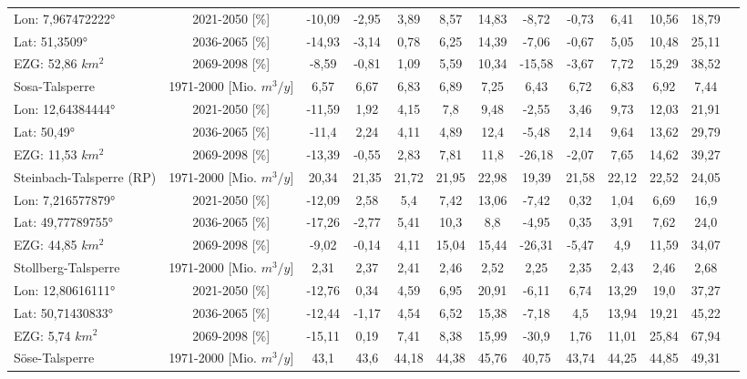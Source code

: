 \begin{longtable}{@{\extracolsep{\fill}}lc|ccccc||cccccc}
\cline{2-13} 
Lon: 7,967472222° & 2021-2050 [\%]  & -10,09 & -2,95 & 3,89 & 8,57 & 14,83 & -8,72 & -0,73 & 6,41 & 10,56 & 18,79 & \\ 
Lat: 51,3509° & 2036-2065 [\%]  & -14,93 & -3,14 & 0,78 & 6,25 & 14,39 & -7,06 & -0,67 & 5,05 & 10,48 & 25,11 & \\ 
EZG: 52,86 $km^2$ & 2069-2098 [\%]  & -8,59 & -0,81 & 1,09 & 5,59 & 10,34 & -15,58 & -3,67 & 7,72 & 15,29 & 38,52 & \\ 
\hline 
Sosa-Talsperre & 1971-2000 [Mio. $m^3/y$]  & 6,57 & 6,67 & 6,83 & 6,89 & 7,25 & 6,43 & 6,72 & 6,83 & 6,92 & 7,44 & \\ 
\cline{2-13} 
Lon: 12,64384444° & 2021-2050 [\%]  & -11,59 & 1,92 & 4,15 & 7,8 & 9,48 & -2,55 & 3,46 & 9,73 & 12,03 & 21,91 & \\ 
Lat: 50,49° & 2036-2065 [\%]  & -11,4 & 2,24 & 4,11 & 4,89 & 12,4 & -5,48 & 2,14 & 9,64 & 13,62 & 29,79 & \\ 
EZG: 11,53 $km^2$ & 2069-2098 [\%]  & -13,39 & -0,55 & 2,83 & 7,81 & 11,8 & -26,18 & -2,07 & 7,65 & 14,62 & 39,27 & \\ 
\hline 
Steinbach-Talsperre (RP) & 1971-2000 [Mio. $m^3/y$]  & 20,34 & 21,35 & 21,72 & 21,95 & 22,98 & 19,39 & 21,58 & 22,12 & 22,52 & 24,05 & \\ 
\cline{2-13} 
Lon: 7,216577879° & 2021-2050 [\%]  & -12,09 & 2,58 & 5,4 & 7,42 & 13,06 & -7,42 & 0,32 & 1,04 & 6,69 & 16,9 & \\ 
Lat: 49,77789755° & 2036-2065 [\%]  & -17,26 & -2,77 & 5,41 & 10,3 & 8,8 & -4,95 & 0,35 & 3,91 & 7,62 & 24,0 & \\ 
EZG: 44,85 $km^2$ & 2069-2098 [\%]  & -9,02 & -0,14 & 4,11 & 15,04 & 15,44 & -26,31 & -5,47 & 4,9 & 11,59 & 34,07 & \\ 
\hline 
Stollberg-Talsperre & 1971-2000 [Mio. $m^3/y$]  & 2,31 & 2,37 & 2,41 & 2,46 & 2,52 & 2,25 & 2,35 & 2,43 & 2,46 & 2,68 & \\ 
\cline{2-13} 
Lon: 12,80616111° & 2021-2050 [\%]  & -12,76 & 0,34 & 4,59 & 6,95 & 20,91 & -6,11 & 6,74 & 13,29 & 19,0 & 37,27 & \\ 
Lat: 50,71430833° & 2036-2065 [\%]  & -12,44 & -1,17 & 4,54 & 6,52 & 15,38 & -7,18 & 4,5 & 13,94 & 19,21 & 45,22 & \\ 
EZG: 5,74 $km^2$ & 2069-2098 [\%]  & -15,11 & 0,19 & 7,41 & 8,38 & 15,99 & -30,9 & 1,76 & 11,01 & 25,84 & 67,94 & \\ 
\hline 
Söse-Talsperre & 1971-2000 [Mio. $m^3/y$]  & 43,1 & 43,6 & 44,18 & 44,38 & 45,76 & 40,75 & 43,74 & 44,25 & 44,85 & 49,31 & \\ 

\end{longtable}
